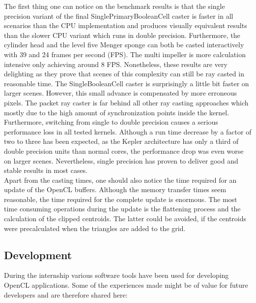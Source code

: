 The first thing one can notice on the benchmark results is that the single precision variant of the final SinglePrimaryBooleanCell caster is faster in all scenarios than the CPU implementation and produces visually equivalent results than the slower CPU variant which runs in double precision. Furthermore, the cylinder head and the level five Menger sponge can both be casted interactively with 39 and 24 frames per second (FPS). The multi impeller is more calculation intensive only achieving around 8 FPS. Nonetheless, these results are very delighting as they prove that scenes of this complexity can still be ray casted in reasonable time. The SingleBooleanCell caster is surprisingly a little bit faster on larger scenes. However, this small advance is compensated by more erroneous pixels. The packet ray caster is far behind all other ray casting approaches which mostly due to the high amount of synchronization points inside the kernel. Furthermore, switching from single to double precision causes a serious performance loss in all tested kernels. Although a run time decrease by a factor of two to three has been expected, as the Kepler architecture has only a third of double precision units than normal cores, the performance drop was even worse on larger scenes. Nevertheless, single precision has proven to deliver good and stable results in most cases. \\
Apart from the casting times, one should also notice the time required for an update of the OpenCL buffers. Although the memory transfer times seem reasonable, the time required for the complete update is enormous. The most time consuming operations during the update is the flattening process and the calculation of the clipped centroids. The latter could be avoided, if the centroids were precalculated when the triangles are added to the grid.

\subsection{Development}

During the internship various software tools have been used for developing OpenCL applications. Some of the experiences made might be of value for future developers and are therefore shared here:

